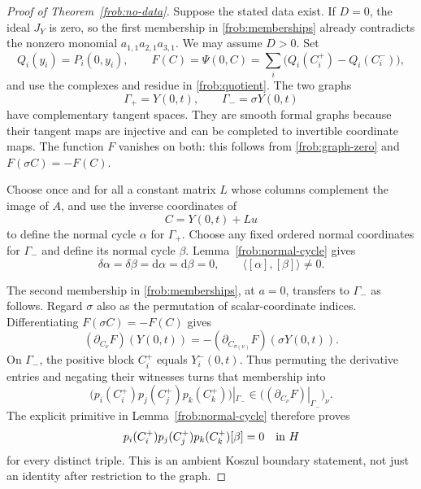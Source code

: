 \begin{proof}[Proof of Theorem~\ref{frob:no-data}]
Suppose the stated data exist.  If $D=0$, the ideal $J_Y$ is zero, so
the first membership in \eqref{frob:memberships} already contradicts
the nonzero monomial $a_{1,1}a_{2,1}a_{3,1}$.  We may assume $D>0$.
Set
\[
 Q_i(y_i)=P_i(0,y_i),\qquad
 F(C)=\Psi(0,C)=\sum_i\bigl(Q_i(C_i^+)-Q_i(C_i^-)\bigr),
\]
and use the complexes and residue in \eqref{frob:quotient}.
The two graphs
\[
               \Gamma_+=Y(0,t),\qquad \Gamma_-=\sigma Y(0,t)
\]
have complementary tangent spaces.  They are smooth formal graphs
because their tangent maps are injective and can be completed to
invertible coordinate maps.  The function $F$ vanishes on both: this
follows from \eqref{frob:graph-zero} and $F(\sigma C)=-F(C)$.

Choose once and for all a constant matrix $L$ whose columns complement
the image of $A$, and use the inverse coordinates of
\begin{equation}
                       C=Y(0,t)+Lu
 \label{frob:fixed-complement}
\end{equation}
to define the normal cycle $\alpha$ for $\Gamma_+$.  Choose any fixed
ordered normal coordinates for $\Gamma_-$ and define its normal cycle
$\beta$.  Lemma~\ref{frob:normal-cycle} gives
\begin{equation}
 \delta\alpha=\delta\beta=\mathrm d\alpha=\mathrm d\beta=0,
 \qquad \langle[\alpha],[\beta]\rangle\ne0.
 \label{frob:initial-pair}
\end{equation}

The second membership in \eqref{frob:memberships}, at $a=0$, transfers
to $\Gamma_-$ as follows.  Regard $\sigma$ also as the permutation of
scalar-coordinate indices.  Differentiating $F(\sigma C)=-F(C)$ gives
\[
 (\partial_{C_\nu}F)(Y(0,t))
       =-(\partial_{C_{\sigma(\nu)}}F)(\sigma Y(0,t)).
\]
On $\Gamma_-$, the positive block $C_i^+$ equals $Y_i^-(0,t)$.
Thus permuting the derivative entries and negating their witnesses
turns that membership into
\[
 \bigl(p_i(C_i^+)p_j(C_j^+)p_k(C_k^+)\bigr)|_{\Gamma_-}
               \in\bigl((\partial_{C_\nu}F)|_{\Gamma_-}\bigr)_\nu.
\]
The explicit primitive in Lemma~\ref{frob:normal-cycle} therefore proves
\begin{equation}
        p_i(C_i^+)p_j(C_j^+)p_k(C_k^+)[\beta]=0
                    \quad\hbox{in }H
 \label{frob:triple-annihilation}
\end{equation}
for every distinct triple.  This is an ambient Koszul boundary
statement, not just an identity after restriction to the graph.


\end{proof}
